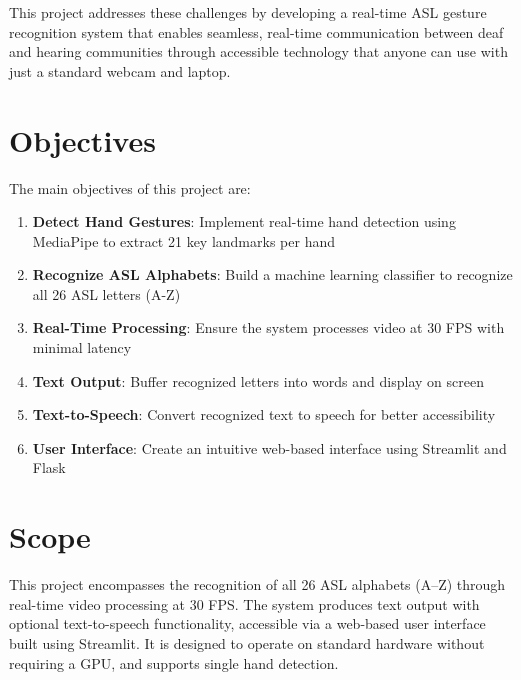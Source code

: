 This project addresses these challenges by developing a real-time ASL gesture recognition system that enables seamless, real-time communication between deaf and hearing communities through accessible technology that anyone can use with just a standard webcam and laptop.

\vspace{1em}
\section{Objectives}

The main objectives of this project are:

\begin{enumerate}
    \item \textbf{Detect Hand Gestures}: Implement real-time hand detection using MediaPipe to extract 21 key landmarks per hand
    \item \textbf{Recognize ASL Alphabets}: Build a machine learning classifier to recognize all 26 ASL letters (A-Z)
    \item \textbf{Real-Time Processing}: Ensure the system processes video at 30 FPS with minimal latency
    \item \textbf{Text Output}: Buffer recognized letters into words and display on screen
    \item \textbf{Text-to-Speech}: Convert recognized text to speech for better accessibility
    \item \textbf{User Interface}: Create an intuitive web-based interface using Streamlit and Flask
\end{enumerate}

\vspace{1em}
\section{Scope}

This project encompasses the recognition of all 26 ASL alphabets (A--Z) through real-time video processing at 30 FPS. The system produces text output with optional text-to-speech functionality, accessible via a web-based user interface built using Streamlit. It is designed to operate on standard hardware without requiring a GPU, and supports single hand detection.



